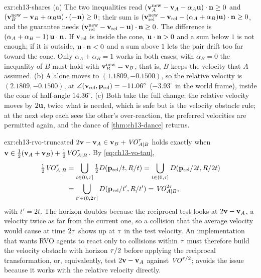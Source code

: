 \begin{solution}{exr:ch13-shares}
(a) The two inequalities read $(\mathbf{v}_A^{\mathrm{new}} - \mathbf{v}_A - \alpha_A\mathbf{u})\cdot\mathbf{n} \ge 0$ and $(\mathbf{v}_B^{\mathrm{new}} - \mathbf{v}_B + \alpha_B\mathbf{u})\cdot(-\mathbf{n}) \ge 0$; their sum is $(\mathbf{v}^{\mathrm{new}}_{\mathrm{rel}} - \mathbf{v}_{\mathrm{rel}} - (\alpha_A + \alpha_B)\mathbf{u})\cdot\mathbf{n} \ge 0$, and the guarantee needs $(\mathbf{v}^{\mathrm{new}}_{\mathrm{rel}} - \mathbf{v}_{\mathrm{rel}} - \mathbf{u})\cdot\mathbf{n} \ge 0$. The difference is $(\alpha_A + \alpha_B - 1)\,\mathbf{u}\cdot\mathbf{n}$. If $\mathbf{v}_{\mathrm{rel}}$ is inside the cone, $\mathbf{u}\cdot\mathbf{n} > 0$ and a sum below $1$ is not enough; if it is outside, $\mathbf{u}\cdot\mathbf{n} < 0$ and a sum above $1$ lets the pair drift too far toward the cone. Only $\alpha_A + \alpha_B = 1$ works in both cases; with $\alpha_B = 0$ the inequality of $B$ must hold with $\mathbf{v}_B^{\mathrm{new}} = \mathbf{v}_B$, that is, $B$ keeps the velocity that $A$ assumed. (b) A alone moves to $(1.1809, -0.1500)$, so the relative velocity is $(2.1809, -0.1500)$, at $\angle(\mathbf{v}_{\mathrm{rel}}, \mathbf{p}_{\mathrm{rel}}) = -11.06^\circ$ ($-3.93^\circ$ in the world frame), inside the cone of half-angle $14.36^\circ$. (c) Both take the full change: the relative velocity moves by $2\mathbf{u}$, twice what is needed, which is safe but is the velocity obstacle rule; at the next step each sees the other's over-reaction, the preferred velocities are permitted again, and the dance of \cref{thm:ch13-dance} returns.
\end{solution}

\begin{solution}{exr:ch13-rvo-truncated}
$2\mathbf{v} - \mathbf{v}_A \in \mathbf{v}_B + \mathit{VO}^{\tau}_{A|B}$ holds exactly when $\mathbf{v} \in \tfrac12(\mathbf{v}_A + \mathbf{v}_B) + \tfrac12\mathit{VO}^{\tau}_{A|B}$. By \cref{eq:ch13-vo-tau},
\begin{align*}
  \tfrac12\mathit{VO}^{\tau}_{A|B}
  &= \bigcup_{t \in (0,\tau]} \tfrac12D(\mathbf{p}_{\mathrm{rel}}/t,R/t)
   = \bigcup_{t \in (0,\tau]} D(\mathbf{p}_{\mathrm{rel}}/2t,R/2t)\\
  &= \bigcup_{t' \in (0,2\tau]} D(\mathbf{p}_{\mathrm{rel}}/t',R/t')
   = \mathit{VO}^{2\tau}_{A|B},
\end{align*}
with $t' = 2t$. The horizon doubles because the reciprocal test looks at $2\mathbf{v} - \mathbf{v}_A$, a velocity twice as far from the current one, so a collision that the average velocity would cause at time $2\tau$ shows up at $\tau$ in the test velocity. An implementation that wants RVO agents to react only to collisions within $\tau$ must therefore build the velocity obstacle with horizon $\tau/2$ before applying the reciprocal transformation, or, equivalently, test $2\mathbf{v} - \mathbf{v}_A$ against $\mathit{VO}^{\tau/2}$; \orca avoids the issue because it works with the relative velocity directly.
\end{solution}

